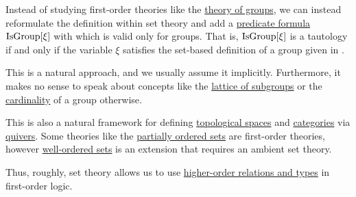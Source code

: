 \begin{remark}\label{rem:first_order_theories_in_zfc}
  Instead of studying first-order theories like the \hyperref[def:group/theory]{theory of groups}, we can instead reformulate the definition within set theory and add a \hyperref[rem:predicate_formula]{predicate formula} \( \operatorname{IsGroup}[\xi] \) with which is valid only for groups. That is, \( \operatorname{IsGroup}[\xi] \) is a tautology if and only if the variable \( \xi \) satisfies the set-based definition of a group given in .

  This is a natural approach, and we usually assume it implicitly. Furthermore, it makes no sense to speak about concepts like the \hyperref[thm:substructures_form_complete_lattice]{lattice of subgroups} or the \hyperref[def:cardinal]{cardinality} of a group otherwise.

  This is also a natural framework for defining \hyperref[def:topological_space]{topological spaces} and \hyperref[def:category]{categories} via \hyperref[def:graph/quiver]{quivers}. Some theories like the \hyperref[def:partially_ordered_set]{partially ordered sets} are first-order theories, however \hyperref[def:well_ordered_set]{well-ordered sets} is an extension that requires an ambient set theory.

  Thus, roughly, set theory allows us to use \hyperref[rem:higher_order_logic]{higher-order relations and types} in first-order logic.
\end{remark}

